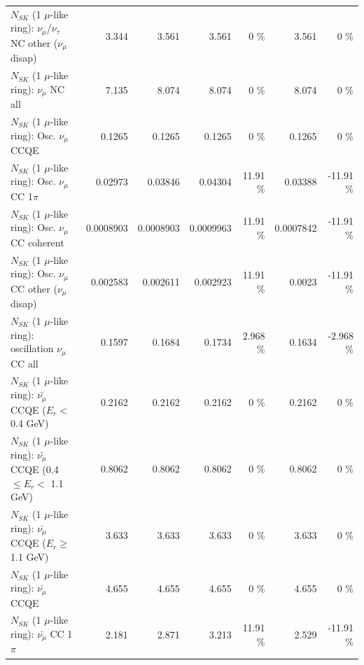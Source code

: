 \begin{table}
\begin{tabular}{| l | r | r | r  r | r  r |}
   $N_{SK}$ (1 $\mu$-like ring): $\nu_\mu$/$\nu_\tau$ NC other ($\nu_\mu$ disap) &           3.344 &           3.561 &           3.561 &        0 \%  &           3.561 &        0 \%  \\ 
                                $N_{SK}$ (1 $\mu$-like ring): $\nu_{\mu}$ NC all &           7.135 &           8.074 &           8.074 &        0 \%  &           8.074 &        0 \%  \\ 
\hline
\hline
                               $N_{SK}$ (1 $\mu$-like ring): Osc. $\nu_\mu$ CCQE &          0.1265 &          0.1265 &          0.1265 &        0 \%  &          0.1265 &        0 \%  \\ 
                          $N_{SK}$ (1 $\mu$-like ring): Osc. $\nu_\mu$ CC 1$\pi$ &         0.02973 &         0.03846 &         0.04304 &    11.91 \%  &         0.03388 &   -11.91 \%  \\ 
                        $N_{SK}$ (1 $\mu$-like ring): Osc. $\nu_\mu$ CC coherent &       0.0008903 &       0.0008903 &       0.0009963 &    11.91 \%  &       0.0007842 &   -11.91 \%  \\ 
         $N_{SK}$ (1 $\mu$-like ring): Osc. $\nu_\mu$ CC other ($\nu_\mu$ disap) &        0.002583 &        0.002611 &        0.002923 &    11.91 \%  &          0.0023 &   -11.91 \%  \\ 
                      $N_{SK}$ (1 $\mu$-like ring): oscillation $\nu_\mu$ CC all &          0.1597 &          0.1684 &          0.1734 &    2.968 \%  &          0.1634 &   -2.968 \%  \\ 
\hline
\hline
          $N_{SK}$ (1 $\mu$-like ring): $\bar{\nu_\mu}$ CCQE ($E_{r} <$ 0.4 GeV) &          0.2162 &          0.2162 &          0.2162 &        0 \%  &          0.2162 &        0 \%  \\ 
 $N_{SK}$ (1 $\mu$-like ring): $\bar{\nu_\mu}$ CCQE (0.4 $\leq E_{r} <$ 1.1 GeV) &          0.8062 &          0.8062 &          0.8062 &        0 \%  &          0.8062 &        0 \%  \\ 
       $N_{SK}$ (1 $\mu$-like ring): $\bar{\nu_\mu}$ CCQE ($E_{r} \geq$ 1.1 GeV) &           3.633 &           3.633 &           3.633 &        0 \%  &           3.633 &        0 \%  \\ 
\hline
                              $N_{SK}$ (1 $\mu$-like ring): $\bar{\nu_\mu}$ CCQE &           4.655 &           4.655 &           4.655 &        0 \%  &           4.655 &        0 \%  \\ 
                         $N_{SK}$ (1 $\mu$-like ring): $\bar{\nu_\mu}$ CC 1$\pi$ &           2.181 &           2.871 &           3.213 &    11.91 \%  &           2.529 &   -11.91 \%  \\ 

\end{tabular}
\end{table}
